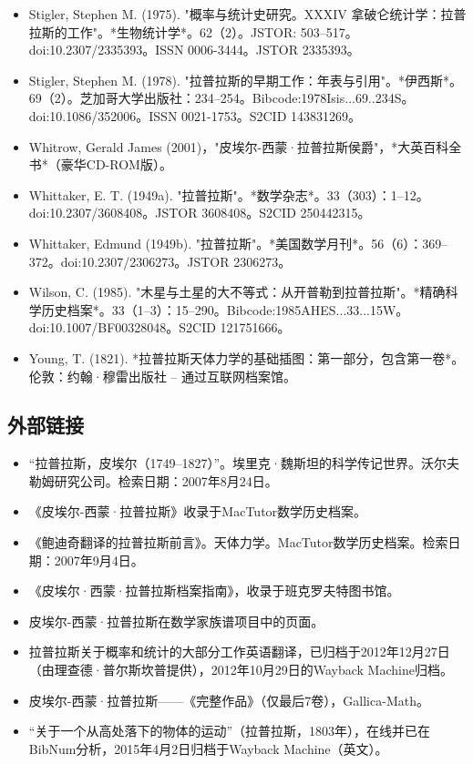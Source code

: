 \begin{itemize}
\item Stigler, Stephen M. (1975). "概率与统计史研究。XXXIV 拿破仑统计学：拉普拉斯的工作"。*生物统计学*。62（2）。JSTOR: 503–517。doi:10.2307/2335393。ISSN 0006-3444。JSTOR 2335393。  
\item Stigler, Stephen M. (1978). "拉普拉斯的早期工作：年表与引用"。*伊西斯*。69（2）。芝加哥大学出版社：234–254。Bibcode:1978Isis...69..234S。doi:10.1086/352006。ISSN 0021-1753。S2CID 143831269。  
\item Whitrow, Gerald James (2001)，"皮埃尔-西蒙·拉普拉斯侯爵"，*大英百科全书*（豪华CD-ROM版）。  
\item Whittaker, E. T. (1949a). "拉普拉斯"。*数学杂志*。33（303）：1–12。doi:10.2307/3608408。JSTOR 3608408。S2CID 250442315。  
\item Whittaker, Edmund (1949b). "拉普拉斯"。*美国数学月刊*。56（6）：369–372。doi:10.2307/2306273。JSTOR 2306273。  
\item Wilson, C. (1985). "木星与土星的大不等式：从开普勒到拉普拉斯"。*精确科学历史档案*。33（1–3）：15–290。Bibcode:1985AHES...33...15W。doi:10.1007/BF00328048。S2CID 121751666。  
\item Young, T. (1821). *拉普拉斯天体力学的基础插图：第一部分，包含第一卷*。伦敦：约翰·穆雷出版社 – 通过互联网档案馆。
\end{itemize}
\subsection{外部链接}
\begin{itemize}
\item “拉普拉斯，皮埃尔（1749–1827）”。埃里克·魏斯坦的科学传记世界。沃尔夫勒姆研究公司。检索日期：2007年8月24日。  
\item 《皮埃尔-西蒙·拉普拉斯》收录于MacTutor数学历史档案。  
\item 《鲍迪奇翻译的拉普拉斯前言》。天体力学。MacTutor数学历史档案。检索日期：2007年9月4日。  
\item 《皮埃尔·西蒙·拉普拉斯档案指南》，收录于班克罗夫特图书馆。  
\item 皮埃尔-西蒙·拉普拉斯在数学家族谱项目中的页面。  
\item 拉普拉斯关于概率和统计的大部分工作英语翻译，已归档于2012年12月27日（由理查德·普尔斯坎普提供），2012年10月29日的Wayback Machine归档。  
\item 皮埃尔-西蒙·拉普拉斯——《完整作品》（仅最后7卷），Gallica-Math。  
\item “关于一个从高处落下的物体的运动”（拉普拉斯，1803年），在线并已在BibNum分析，2015年4月2日归档于Wayback Machine（英文）。
\end{itemize}